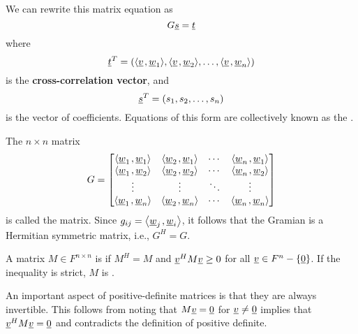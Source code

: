 We can rewrite this matrix equation as
\begin{equation*}
G \underline{s} = \underline{t}
\end{equation*}
where
\begin{equation*}
\underline{t}^T = 
\left(
{\left\langle  \underline{v}  \mskip2mu ,  \underline{w}_1  \right\rangle},
{\left\langle  \underline{v}  \mskip2mu ,  \underline{w}_2  \right\rangle}, \ldots,
{\left\langle  \underline{v}  \mskip2mu ,  \underline{w}_n  \right\rangle} \right)
\end{equation*}
is the \textbf{cross-correlation vector}, and
\begin{equation*}
\underline{s}^T = 
\left( s_1, s_2, \ldots, s_n \right)
\end{equation*}
is the vector of coefficients.
Equations of this form are collectively known as the .

\begin{definition}
The $n \times n$ matrix
\begin{equation} \label{equation:GramianMatrix}
G = \begin{bmatrix}
{\left\langle  \underline{w}_1  \mskip2mu ,  \underline{w}_1  \right\rangle}
& {\left\langle  \underline{w}_2  \mskip2mu ,  \underline{w}_1  \right\rangle} & \cdots
& {\left\langle  \underline{w}_n  \mskip2mu ,  \underline{w}_1  \right\rangle} \\
{\left\langle  \underline{w}_1  \mskip2mu ,  \underline{w}_2  \right\rangle}
& {\left\langle  \underline{w}_2  \mskip2mu ,  \underline{w}_2  \right\rangle} & \cdots
& {\left\langle  \underline{w}_n  \mskip2mu ,  \underline{w}_2  \right\rangle} \\
\vdots & \vdots & \ddots & \vdots \\
{\left\langle  \underline{w}_1  \mskip2mu ,  \underline{w}_n  \right\rangle}
& {\left\langle  \underline{w}_2  \mskip2mu ,  \underline{w}_n  \right\rangle} & \cdots
& {\left\langle  \underline{w}_n  \mskip2mu ,  \underline{w}_n  \right\rangle}
\end{bmatrix}
\end{equation}
is called the  matrix.
Since $g_{ij} = {\left\langle  \underline{w}_j  \mskip2mu ,  \underline{w}_i  \right\rangle}$, it follows that the Gramian is a Hermitian symmetric matrix, i.e., $G^H = G$.
\end{definition}

\begin{definition}
A matrix $M\in F^{n \times n}$ is  if $M^H \!=\! M$ and $\underline{v}^H M \underline{v} \geq 0$ for all $\underline{v} \in F^n - \left\{ \underline{0} \right\}$.
If the inequality is strict, $M$ is .
\end{definition}

An important aspect of positive-definite matrices is that they are always invertible.
This follows from noting that $M\underline{v} = \underline{0}$ for $\underline{v}\neq\underline{0}$ implies that $\underline{v}^H M \underline{v} = \underline{0}$ and contradicts the definition of positive definite.

